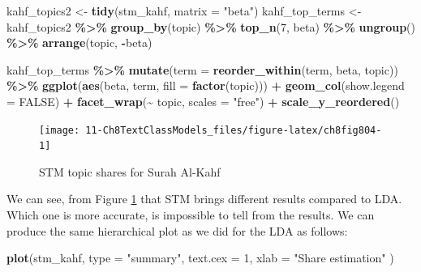 \documentclass[
]{article}
\newenvironment{Shaded}{\begin{snugshade}}{\end{snugshade}}
\newcommand{\AttributeTok}[1]{\textcolor[rgb]{0.13,0.29,0.53}{#1}}
\newcommand{\ConstantTok}[1]{\textcolor[rgb]{0.56,0.35,0.01}{#1}}
\newcommand{\DecValTok}[1]{\textcolor[rgb]{0.00,0.00,0.81}{#1}}
\newcommand{\FunctionTok}[1]{\textcolor[rgb]{0.13,0.29,0.53}{\textbf{#1}}}
\newcommand{\NormalTok}[1]{#1}
\newcommand{\OtherTok}[1]{\textcolor[rgb]{0.56,0.35,0.01}{#1}}
\newcommand{\SpecialCharTok}[1]{\textcolor[rgb]{0.81,0.36,0.00}{\textbf{#1}}}
\newcommand{\StringTok}[1]{\textcolor[rgb]{0.31,0.60,0.02}{#1}}
\begin{document}
\begin{Shaded}
\begin{Highlighting}[]
\NormalTok{kahf\_topics2 }\OtherTok{\textless{}{-}} \FunctionTok{tidy}\NormalTok{(stm\_kahf, }\AttributeTok{matrix =} \StringTok{"beta"}\NormalTok{)}
\NormalTok{kahf\_top\_terms }\OtherTok{\textless{}{-}}\NormalTok{ kahf\_topics2 }\SpecialCharTok{\%\textgreater{}\%}
  \FunctionTok{group\_by}\NormalTok{(topic) }\SpecialCharTok{\%\textgreater{}\%}
  \FunctionTok{top\_n}\NormalTok{(}\DecValTok{7}\NormalTok{, beta) }\SpecialCharTok{\%\textgreater{}\%}
  \FunctionTok{ungroup}\NormalTok{() }\SpecialCharTok{\%\textgreater{}\%}
  \FunctionTok{arrange}\NormalTok{(topic, }\SpecialCharTok{{-}}\NormalTok{beta)}

\NormalTok{kahf\_top\_terms }\SpecialCharTok{\%\textgreater{}\%}
  \FunctionTok{mutate}\NormalTok{(}\AttributeTok{term =} \FunctionTok{reorder\_within}\NormalTok{(term, beta, topic)) }\SpecialCharTok{\%\textgreater{}\%}
  \FunctionTok{ggplot}\NormalTok{(}\FunctionTok{aes}\NormalTok{(beta, term, }\AttributeTok{fill =} \FunctionTok{factor}\NormalTok{(topic))) }\SpecialCharTok{+}
  \FunctionTok{geom\_col}\NormalTok{(}\AttributeTok{show.legend =} \ConstantTok{FALSE}\NormalTok{) }\SpecialCharTok{+}
  \FunctionTok{facet\_wrap}\NormalTok{(}\SpecialCharTok{\textasciitilde{}}\NormalTok{ topic, }\AttributeTok{scales =} \StringTok{"free"}\NormalTok{) }\SpecialCharTok{+}
  \FunctionTok{scale\_y\_reordered}\NormalTok{()}
\end{Highlighting}
\end{Shaded}

\begin{figure}

{\centering \texttt{[image: 11-Ch8TextClassModels\_files/figure-latex/ch8fig804-1]} 

}

\caption{STM topic shares for Surah Al-Kahf}\label{fig:ch8fig804}
\end{figure}

We can see, from Figure \ref{fig:ch8fig804} that STM brings different results compared to LDA. Which one is more accurate, is impossible to tell from the results. We can produce the same hierarchical plot as we did for the LDA as follows:

\begin{Shaded}
\begin{Highlighting}[]
\FunctionTok{plot}\NormalTok{(stm\_kahf, }\AttributeTok{type =} \StringTok{"summary"}\NormalTok{, }\AttributeTok{text.cex =} \DecValTok{1}\NormalTok{,}
  \AttributeTok{xlab =} \StringTok{"Share estimation"}
\NormalTok{)}
\end{Highlighting}
\end{Shaded}
\end{document}
